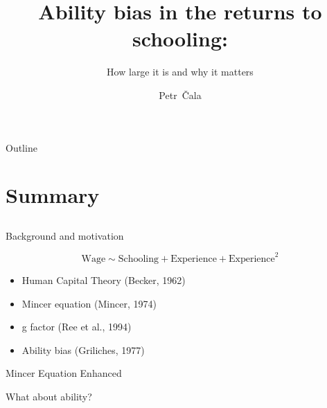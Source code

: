 \documentclass{beamer} %
\title[Ability bias and education] %
{Ability bias in the returns to schooling:}
\subtitle{How large it is and why it matters}
\author {Petr~\v{C}ala}
\institute[CUNI]
{
  Institute of Economic Studies\\
  Charles University, Prague\\
 
  \vspace{1.5em}

  \pgfdeclareimage[height=1.5cm]{logo}{Figures/logo.pdf} %
  \pgfuseimage{logo}

}
\date[June 19, 2024]
\begin{document}
\begin{frame}
    \titlepage
\end{frame}


\begin{frame}{Outline}
    \tableofcontents
\end{frame}


\section{Summary}
\subsection{}

\begin{frame}{Background and motivation}

    \begin{center}
        \large
        \begin{equation*}
            \text{Wage} \sim \text{Schooling} + \text{Experience} + \text{Experience}^2
        \end{equation*}
    \end{center}


    \begin{itemize}
        \item Human Capital Theory \hfill (Becker, 1962)
        \item Mincer equation \hfill (Mincer, 1974)
        \item g factor \hfill (Ree et al., 1994)
        \item Ability bias \hfill (Griliches, 1977)
    \end{itemize}
\end{frame}

\begin{frame}{Mincer Equation Enhanced}
    \begin{center}

        \begin{Large}
            What about ability?
        \end{Large}


    \end{center}
\end{frame}
\end{document}
